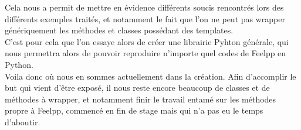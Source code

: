 \documentclass[french,12pt]{article}
\begin{document}
Cela nous a permit de mettre en évidence différents soucis rencontrés lors des différents exemples traités, et notamment le fait que l'on ne peut pas wrapper génériquement les méthodes et classes possédant des templates.\\

C'est pour cela que l'on essaye alors de créer une librairie Pyhton générale, qui nous permettra alors de pouvoir reproduire n'importe quel codes de Feelpp en Python.\\

Voila donc où nous en sommes actuellement dans la création. Afin d'accomplir le but qui vient d'être exposé, il nous reste encore beaucoup de classes et de méthodes à wrapper, et notamment finir le travail entamé sur les méthodes propre à Feelpp, commencé en fin de stage mais qui n'a pas eu le temps d'aboutir.
\end{document}
